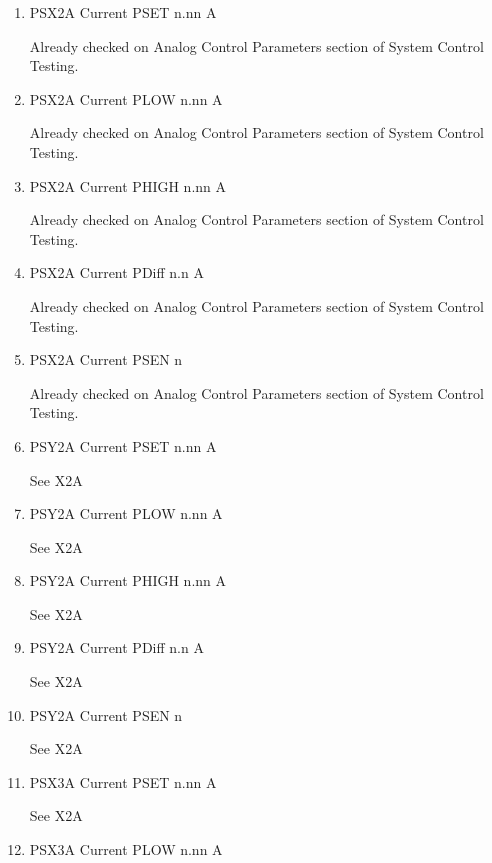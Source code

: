 \documentclass[11pt]{book}		%
\begin{document}
\begin{enumerate}
 \item PSX2A Current PSET  n.nn A

\color{red}
Already checked on Analog Control Parameters section of System Control Testing.
\color{black}

 \item PSX2A Current PLOW  n.nn A

\color{red}
Already checked on Analog Control Parameters section of System Control Testing.
\color{black}

 \item PSX2A Current PHIGH n.nn A

\color{red}
Already checked on Analog Control Parameters section of System Control Testing.
\color{black}

 \item PSX2A Current PDiff n.n A

\color{red}
Already checked on Analog Control Parameters section of System Control Testing.
\color{black}

 \item PSX2A Current PSEN  n

\color{red}
Already checked on Analog Control Parameters section of System Control Testing.
\color{black}

 \item PSY2A Current PSET  n.nn A

\color{red}
See X2A
\color{black}

 \item PSY2A Current PLOW  n.nn A

\color{red}
See X2A
\color{black}

 \item PSY2A Current PHIGH n.nn A

\color{red}
See X2A
\color{black}

 \item PSY2A Current PDiff n.n A

\color{red}
See X2A
\color{black}

 \item PSY2A Current PSEN  n

\color{red}
See X2A
\color{black}

 \item PSX3A Current PSET  n.nn A

\color{red}
See X2A
\color{black}

 \item PSX3A Current PLOW  n.nn A


\end{enumerate}
\end{document}

